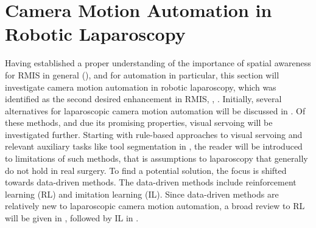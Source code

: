 \section{Camera Motion Automation in Robotic Laparoscopy}
\label{in:sec:camera_motion_automation}
Having established a proper understanding of the importance of spatial awareness for RMIS in general (), and for automation in particular, this section will investigate camera motion automation in robotic laparoscopy, which was identified as the second desired enhancement in RMIS, , . Initially, several alternatives for laparoscopic camera motion automation will be discussed in . Of these methods, and due its promising properties, visual servoing will be investigated further. Starting with rule-based approaches to visual servoing and relevant auxiliary tasks like tool segmentation in , the reader will be introduced to limitations of such methods, that is assumptions to laparoscopy that generally do not hold in real surgery. To find a potential solution, the focus is shifted towards data-driven methods. The data-driven methods include reinforcement learning (RL) and imitation learning (IL). Since data-driven methods are relatively new to laparoscopic camera motion automation, a broad review to RL will be given in , followed by IL in .

